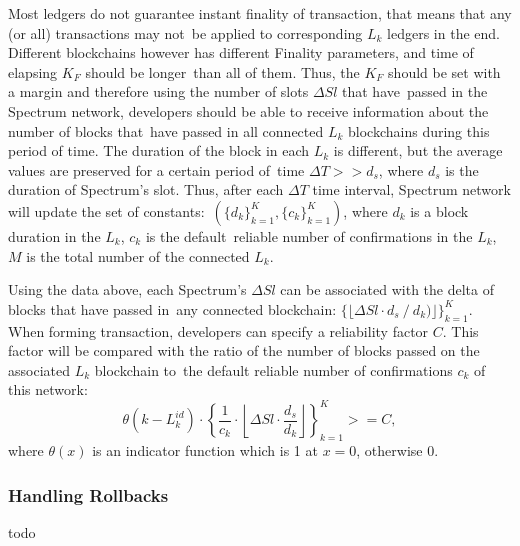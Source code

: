 Most ledgers do not guarantee instant finality of transaction, that means that any (or all) transactions may not\
be applied to corresponding $L_k$ ledgers in the end.
Different blockchains however has different Finality parameters, and time of elapsing $K_F$ should be longer\
than all of them.
Thus, the $K_F$ should be set with a margin and therefore using the number of slots $\Delta Sl$ that have\
passed in the Spectrum network, developers should be able to receive information about the number of blocks that\
have passed in all connected $L_k$ blockchains during this period of time.
The duration of the block in each $L_k$ is different, but the average values are preserved for a certain period of\
time ${\Delta T >> d_s}$, where $d_s$ is the duration of Spectrum's slot.
Thus, after each $\Delta T$ time interval, Spectrum network will update the set of constants:\
${(\{d_{k}\}_{k=1}^{K},\{c_{k}\}_{k=1}^{K})}$, where $d_k$ is a block duration in the $L_k$, $c_k$ is the default\
reliable number of confirmations in the $L_k$, $M$ is the total number of the connected $L_k$.

Using the data above, each Spectrum's $\Delta Sl$ can be associated with the delta of blocks that have passed in\
any connected blockchain: ${\{\lfloor \Delta Sl \cdot d_s \mathbin{/} d_k)\rfloor\}_{k=1}^{K}}$.
When forming transaction, developers can specify a reliability factor $C$.
This factor will be compared with the ratio of the number of blocks passed on the associated $L_k$ blockchain to\
the default reliable number of confirmations $c_k$ of this network:
\begin{equation}
    \theta(k-L_k^{id})\cdot \left\{\frac{1}{c_k} \cdot \left\lfloor \Delta Sl \cdot
    \frac{d_s}{d_k}\right\rfloor\right\}_{k=1}^{K} >= C,\label{eq:equation2}
\end{equation}
where $\theta(x)$ is an indicator function which is 1 at $x = 0$, otherwise 0.

\subsubsection{Handling Rollbacks}\label{subsec:rollbacks}
todo
